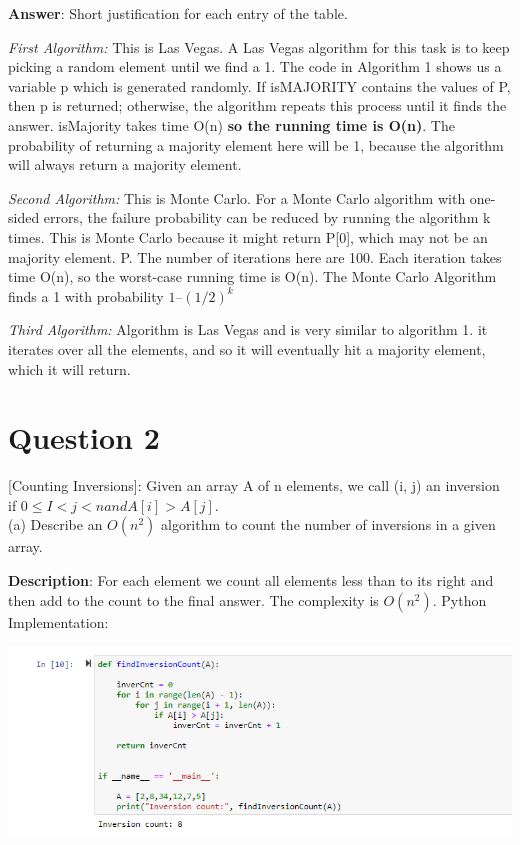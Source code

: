 \documentclass{article}
\begin{document}
\begin{flushleft}

\textbf{Answer}:
Short justification for each entry of the
table.
\linebreak 

\emph{First Algorithm:} This is Las Vegas.  A Las Vegas algorithm for this task is to keep picking a random element until we find a 1. The code in Algorithm 1 shows us a variable p which is generated randomly. If isMAJORITY contains the values of P, then p is returned; otherwise, the algorithm repeats this process until it finds the answer. isMajority takes time O(n) \textbf{ so the running time is O(n)}. The probability of returning a majority element here will be 1, because the algorithm will always return a majority element.
\linebreak 

\emph{Second Algorithm:} This is Monte Carlo. For a Monte Carlo algorithm with one-sided errors, the failure probability can be reduced by running the algorithm k times. This is Monte Carlo because it might return P[0], which may not be an majority element.
P. The number of iterations here are 100. Each iteration takes time O(n), so the
worst-case running time is O(n). The Monte Carlo Algorithm finds a 1 with probability $1 – (1/2)^k$
\linebreak 

\emph{Third Algorithm:} Algorithm is Las Vegas and is very similar to algorithm 1.  it iterates over all the elements, and so it will eventually hit a majority element, which it will return.

\section*{Question 2}

[Counting Inversions]: Given an array A of n elements, we call (i, j) an inversion if $0 \le I < j < n and A[i] > A[j].$\\
(a) Describe an $O(n^2)$ algorithm to count the number of inversions in a given array.

\textbf{Description}: For each element we count all elements less than  to its right and then add to the count to the final answer. The complexity is $O(n^2)$. Python Implementation:

\includegraphics{q2lab6}


\end{flushleft}
\end{document}
